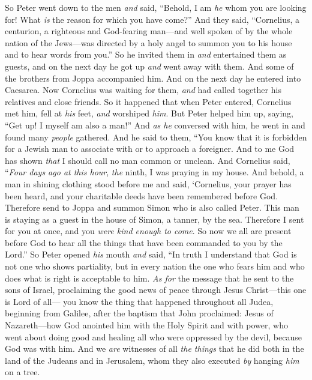 \begin{biblechapter}
\verse So Peter went down to the men \textit{and} said, “Behold, I am \textit{he} whom you are looking for! What \textit{is} the reason for which you have come?”
\verse And they said, “Cornelius, a centurion, a righteous and God-fearing man—and well spoken of by the whole nation of the Jews—was directed by a holy angel to summon you to his house and to hear words from you.”
\verse So he invited them in \textit{and} entertained them as guests, and on the next day he got up \textit{and} went away with them. And some of the brothers from Joppa accompanied him.
\verse And on the next day he entered into Caesarea.
 Now Cornelius was waiting for them, \textit{and} had called together his relatives and close friends.
\verse So it happened that when Peter entered, Cornelius met him, fell at \textit{his} feet, \textit{and} worshiped \textit{him}.
\verse But Peter helped him up, saying, “Get up! I myself am also a man!”
\verse And \textit{as he} conversed with him, he went in and found many \textit{people} gathered.
\verse And he said to them, “You know that it is forbidden for a Jewish man to associate with or to approach a foreigner. And to me God has shown \textit{that} I should call no man common or unclean.
\verse And Cornelius said, “\textit{Four days ago at this hour}, \textit{the} ninth, I was praying in my house. And behold, a man in shining clothing stood before me
\verse and said, ‘Cornelius, your prayer has been heard, and your charitable deeds have been remembered before God.
\verse Therefore send to Joppa and summon Simon who is also called Peter. This man is staying as a guest in the house of Simon, a tanner, by the sea.
\verse Therefore I sent for you at once, and you \textit{were kind enough to come}. So now we all are present before God to hear all the things that have been commanded to you by the Lord.”
\verse So Peter opened \textit{his} mouth \textit{and} said, “In truth I understand that God is not one who shows partiality,
\verse but in every nation the one who fears him and who does what is right is acceptable to him.
\verse \textit{As for} the message that he sent to the sons of Israel, proclaiming the good news of peace through Jesus Christ—this one is Lord of all—
\verse you know the thing that happened throughout all Judea, beginning from Galilee, after the baptism that John proclaimed:
\verse Jesus of Nazareth—how God anointed him with the Holy Spirit and with power, who went about doing good and healing all who were oppressed by the devil, because God was with him.
\verse And we \textit{are} witnesses of all \textit{the things} that he did both in the land of the Judeans and in Jerusalem, whom they also executed \textit{by} hanging \textit{him} on a tree.

\end{biblechapter}

